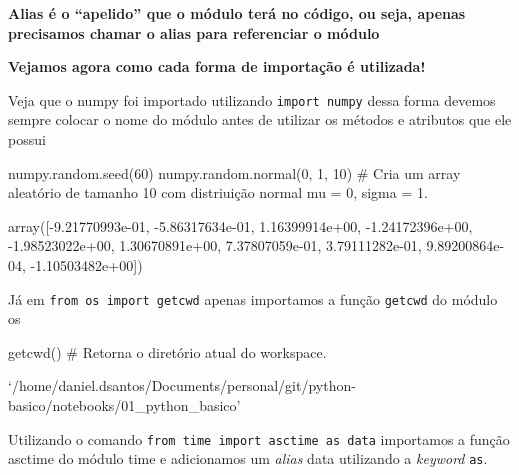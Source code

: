 \documentclass[
  letterpaper,
  DIV=11,
  numbers=noendperiod]{scrreprt}
\newenvironment{Shaded}{\begin{snugshade}}{\end{snugshade}}
\newcommand{\CommentTok}[1]{\textcolor[rgb]{0.37,0.37,0.37}{#1}}
\newcommand{\DecValTok}[1]{\textcolor[rgb]{0.68,0.00,0.00}{#1}}
\newcommand{\NormalTok}[1]{\textcolor[rgb]{0.00,0.23,0.31}{#1}}
\begin{document}
\textbf{Alias é o ``apelido'' que o módulo terá no código, ou seja,
apenas precisamos chamar o alias para referenciar o módulo}

\textbf{Vejamos agora como cada forma de importação é utilizada!}

Veja que o numpy foi importado utilizando \texttt{import\ numpy} dessa
forma devemos sempre colocar o nome do módulo antes de utilizar os
métodos e atributos que ele possui

\begin{Shaded}
\begin{Highlighting}[]
\NormalTok{numpy.random.seed(}\DecValTok{60}\NormalTok{)}
\NormalTok{numpy.random.normal(}\DecValTok{0}\NormalTok{, }\DecValTok{1}\NormalTok{, }\DecValTok{10}\NormalTok{)       }\CommentTok{\# Cria um array aleatório de tamanho 10 com distriuição normal mu = 0, sigma = 1.}
\end{Highlighting}
\end{Shaded}

\begin{tcolorbox}[enhanced jigsaw, breakable, leftrule=.75mm, left=2mm, opacityback=0, bottomrule=.15mm, toprule=.15mm, rightrule=.15mm, arc=.35mm, colback=white]

array({[}-9.21770993e-01, -5.86317634e-01, 1.16399914e+00,
-1.24172396e+00, -1.98523022e+00, 1.30670891e+00, 7.37807059e-01,
3.79111282e-01, 9.89200864e-04, -1.10503482e+00{]})

\end{tcolorbox}

Já em \texttt{from\ os\ import\ getcwd} apenas importamos a função
\texttt{getcwd} do módulo os

\begin{Shaded}
\begin{Highlighting}[]
\NormalTok{getcwd()                            }\CommentTok{\# Retorna o diretório atual do workspace.}
\end{Highlighting}
\end{Shaded}

\begin{tcolorbox}[enhanced jigsaw, breakable, leftrule=.75mm, left=2mm, opacityback=0, bottomrule=.15mm, toprule=.15mm, rightrule=.15mm, arc=.35mm, colback=white]

`/home/daniel.dsantos/Documents/personal/git/python-basico/notebooks/01\_python\_basico'

\end{tcolorbox}

Utilizando o comando \texttt{from\ time\ import\ asctime\ as\ data}
importamos a função asctime do módulo time e adicionamos um \emph{alias}
data utilizando a \emph{keyword} \texttt{as}.
\end{document}
